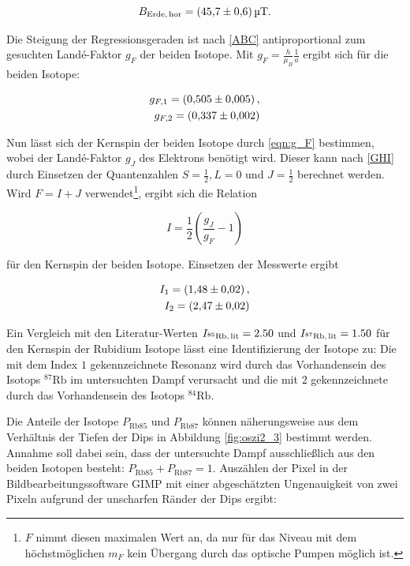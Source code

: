 \begin{equation}
	B_\text{Erde,\,hor} = \SI{45.7\pm 0.6}{\micro \tesla}.
\end{equation}

Die Steigung der Regressionsgeraden ist nach \eqref{ABC} antiproportional zum gesuchten Landé-Faktor $g_F$ der beiden Isotope. Mit $g_F = \frac{h}{\mu_B} \frac{1}{a}$ ergibt sich für die beiden Isotope:

\begin{eqnarray}
	g_{F,1} = \SI{0.505 \pm 0.005},\\
	g_{F,2} = \SI{0.337 \pm 0.002}.
\end{eqnarray}

Nun lässt sich der Kernspin der beiden Isotope durch \eqref{eqn:g_F} bestimmen, wobei der Landé-Faktor $g_J$ des Elektrons benötigt wird. Dieser kann nach \eqref{GHI} durch Einsetzen der Quantenzahlen $S = \frac{1}{2}, L = 0$ und $J = \frac{1}{2}$ berechnet werden. Wird $F = I + J$ verwendet\footnote{$F$ nimmt diesen maximalen Wert an, da nur für das Niveau mit dem höchstmöglichen $m_F$ kein Übergang durch das optische Pumpen möglich ist.}, ergibt sich die Relation

\begin{equation}
	I = \frac{1}{2} \left(\frac{g_J}{g_F} - 1\right)
\end{equation}

für den Kernspin der beiden Isotope. Einsetzen der Messwerte ergibt

\begin{eqnarray}
	I_1 = \SI{1.48 \pm 0.02},\\
	I_2 = \SI{2.47 \pm 0.02}.
\end{eqnarray}

Ein Vergleich mit den Literatur-Werten $I_{{}^{85}\text{Rb,\,lit}} = 2.50$ und $I_{{}^{87}\text{Rb,\,lit}} = 1.50$ \cite{Rb} für den Kernspin der Rubidium Isotope lässt eine Identifizierung der Isotope zu: Die mit dem Index $1$ gekennzeichnete Resonanz wird durch das Vorhandensein des Isotops ${}^{87}\text{Rb}$ im untersuchten Dampf verursacht und die mit $2$ gekennzeichnete durch das Vorhandensein des Isotops ${}^{84}\text{Rb}$.

Die Anteile der Isotope $P_{\text{Rb}85}$ und $P_{\text{Rb}87}$ können näherungsweise aus dem Verhältnis der Tiefen der Dips in Abbildung \ref{fig:oszi2_3} bestimmt werden. Annahme soll dabei sein, dass der untersuchte Dampf ausschließlich aus den beiden Isotopen besteht: $P_{\text{Rb}85} + P_{\text{Rb}87} = 1$. Auszählen der Pixel in der Bildbearbeitungssoftware GIMP \cite{Gimp} mit einer abgeschätzten Ungenauigkeit von zwei Pixeln aufgrund der unscharfen Ränder der Dips ergibt:


